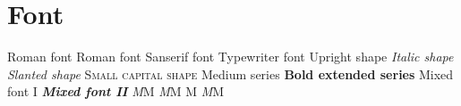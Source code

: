 \documentclass{article}
\begin{document}
    \section{Font}
        \textrm{Roman font}\newline
        {\rmfamily Roman font}\newline              %
        {\sffamily Sanserif font}\newline           %
        {\ttfamily Typewriter font}\newline         %
        {\upshape Upright shape}\newline            %
        {\itshape Italic shape}\newline             %
        {\slshape Slanted shape}\newline            %
        {\scshape Small capital shape}\newline      %
        {\mdseries Medium series}\newline           %
        {\bfseries Bold extended series}\newline    %
        {\rmfamily\upshape\mdseries Mixed font I}\newline
        \textsf\textit\textbf{Mixed font II}\newline
        {\itshape M}M \quad \textit{M}M M\newline
        \textit{M\nocorr}M\newline         %
\end{document}
